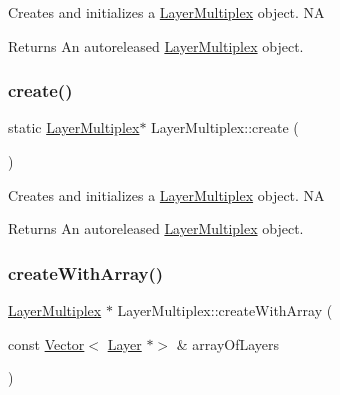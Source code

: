 Creates and initializes a \hyperlink{classLayerMultiplex}{Layer\+Multiplex} object.  NA

\begin{DoxyReturn}{Returns}
An autoreleased \hyperlink{classLayerMultiplex}{Layer\+Multiplex} object. 
\end{DoxyReturn}
\mbox{\label{classLayerMultiplex_abac2813db867fbb516514bcbbe76e3e4}} 
\subsubsection{\texorpdfstring{create()}{create()}\hspace{0.1cm}{\footnotesize\ttfamily [2/2]}}
{\footnotesize\ttfamily static \hyperlink{classLayerMultiplex}{Layer\+Multiplex}$\ast$ Layer\+Multiplex\+::create (\begin{DoxyParamCaption}{ }\end{DoxyParamCaption})\hspace{0.3cm}{\ttfamily [static]}}

Creates and initializes a \hyperlink{classLayerMultiplex}{Layer\+Multiplex} object.  NA

\begin{DoxyReturn}{Returns}
An autoreleased \hyperlink{classLayerMultiplex}{Layer\+Multiplex} object. 
\end{DoxyReturn}
\mbox{\label{classLayerMultiplex_ae44d19293d847a1602d353567281a1ff}} 
\subsubsection{\texorpdfstring{create\+With\+Array()}{createWithArray()}\hspace{0.1cm}{\footnotesize\ttfamily [1/2]}}
{\footnotesize\ttfamily \hyperlink{classLayerMultiplex}{Layer\+Multiplex} $\ast$ Layer\+Multiplex\+::create\+With\+Array (\begin{DoxyParamCaption}\item[{const \hyperlink{classVector}{Vector}$<$ \hyperlink{classLayer}{Layer} $\ast$$>$ \&}]{array\+Of\+Layers }\end{DoxyParamCaption})\hspace{0.3cm}{\ttfamily [static]}}

